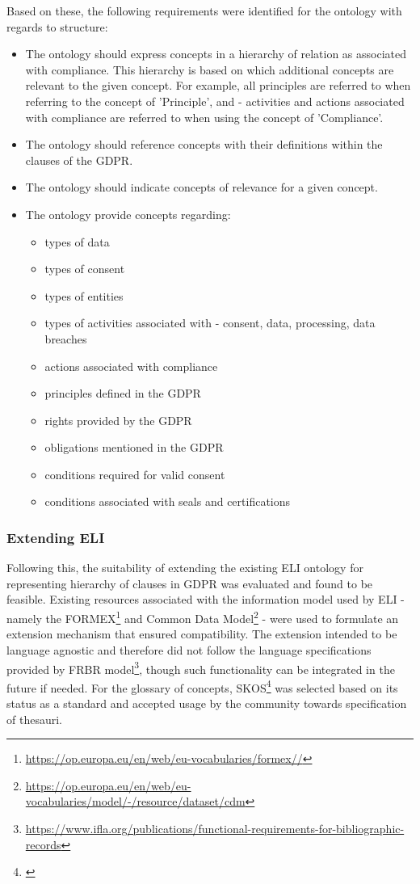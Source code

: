 Based on these, the following requirements were identified for the ontology with regards to structure:
\begin{itemize}
    \item The ontology should express concepts in a hierarchy of relation as associated with compliance. This hierarchy is based on which additional concepts are relevant to the given concept. For example, all principles are referred to when referring to the concept of 'Principle', and - activities and actions associated with compliance are referred to when using the concept of 'Compliance'.
    \item The ontology should reference concepts with their definitions within the clauses of the GDPR.
    \item The ontology should indicate concepts of relevance for a given concept.
    \item The ontology provide concepts regarding:
    \begin{itemize}
        \item types of data
        \item types of consent
        \item types of entities
        \item types of activities associated with - consent, data, processing, data breaches
        \item actions associated with compliance
        \item principles defined in the GDPR
        \item rights provided by the GDPR
        \item obligations mentioned in the GDPR
        \item conditions required for valid consent
        \item conditions associated with seals and certifications
    \end{itemize}
\end{itemize}

\subsubsection{Extending ELI}
Following this, the suitability of extending the existing ELI ontology for representing hierarchy of clauses in GDPR was evaluated and found to be feasible. Existing resources associated with the information model used by ELI - namely the FORMEX\footnote{\url{https://op.europa.eu/en/web/eu-vocabularies/formex//}} and Common Data Model\footnote{\url{https://op.europa.eu/en/web/eu-vocabularies/model/-/resource/dataset/cdm}} - were used to formulate an extension mechanism that ensured compatibility.
The extension intended to be language agnostic and therefore did not follow the language specifications provided by FRBR model\footnote{\url{https://www.ifla.org/publications/functional-requirements-for-bibliographic-records}}, though such functionality can be integrated in the future if needed. For the glossary of concepts, SKOS\footnote{\url{}} was selected based on its status as a standard and accepted usage by the community towards specification of thesauri.

